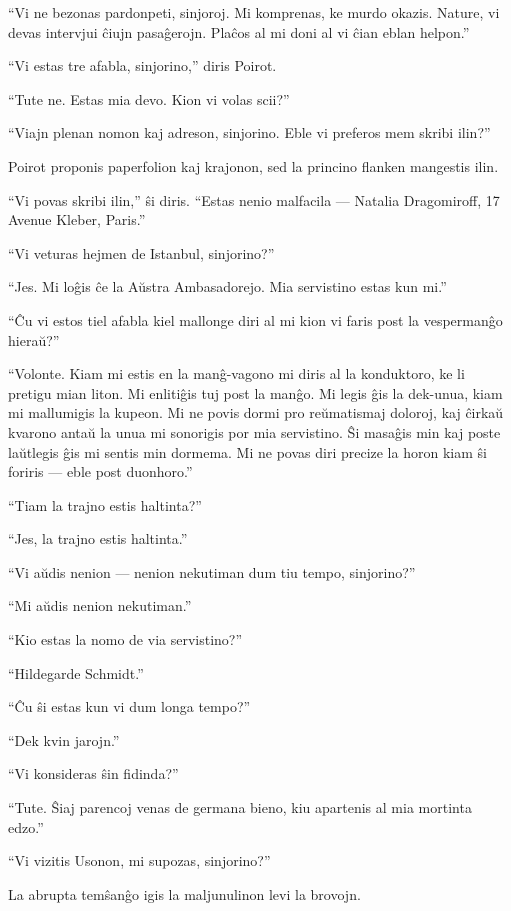 ``Vi ne bezonas pardonpeti, sinjoroj. Mi komprenas, ke murdo okazis. Nature, vi devas intervjui ĉiujn pasaĝerojn. Plaĉos al mi doni al vi ĉian eblan helpon.''

``Vi estas tre afabla, sinjorino,'' diris Poirot.

``Tute ne. Estas mia devo. Kion vi volas scii?''

``Viajn plenan nomon kaj adreson, sinjorino. Eble vi preferos mem skribi ilin?''

Poirot proponis paperfolion kaj krajonon, sed la princino flanken mangestis ilin.

``Vi povas skribi ilin,'' ŝi diris. ``Estas nenio malfacila --- Natalia Dragomiroff, 17 Avenue Kleber, Paris.''

``Vi veturas hejmen de Istanbul, sinjorino?''

``Jes. Mi loĝis ĉe la Aŭstra Ambasadorejo. Mia servistino estas kun mi.''

``Ĉu vi estos tiel afabla kiel mallonge diri al mi kion vi faris post la vespermanĝo hieraŭ?''

``Volonte. Kiam mi estis en la manĝ-vagono mi diris al la konduktoro, ke li pretigu mian liton. Mi enlitiĝis tuj post la manĝo. Mi legis ĝis la dek-unua, kiam mi mallumigis la kupeon. Mi ne povis dormi pro reŭmatismaj doloroj, kaj ĉirkaŭ kvarono antaŭ la unua mi sonorigis por mia servistino. Ŝi masaĝis min kaj poste laŭtlegis ĝis mi sentis min dormema. Mi ne povas diri precize la horon kiam ŝi foriris --- eble post duonhoro.''

``Tiam la trajno estis haltinta?''

``Jes, la trajno estis haltinta.''

``Vi aŭdis nenion --- nenion nekutiman dum tiu tempo, sinjorino?''

``Mi aŭdis nenion nekutiman.''

``Kio estas la nomo de via servistino?''

``Hildegarde Schmidt.''

``Ĉu ŝi estas kun vi dum longa tempo?''

``Dek kvin jarojn.''

``Vi konsideras ŝin fidinda?''

``Tute. Ŝiaj parencoj venas de germana bieno, kiu apartenis al mia mortinta edzo.''

``Vi vizitis Usonon, mi supozas, sinjorino?''

La abrupta temŝanĝo igis la maljunulinon levi la brovojn.

